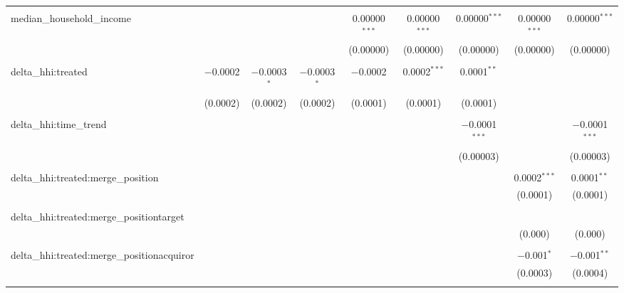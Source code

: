 \begin{table}[H]
{\begin{tabular}{@{\extracolsep{5pt}}lcccccccc}
   & & & & & & & & \\  

  median\_household\_income &  &  &  & 0.00000$^{***}$ & 0.00000$^{***}$ & 0.00000$^{***}$ & 0.00000$^{***}$ & 0.00000$^{***}$ \\  

   &  &  &  & (0.00000) & (0.00000) & (0.00000) & (0.00000) & (0.00000) \\  

   & & & & & & & & \\  

  delta\_hhi:treated & $-$0.0002 & $-$0.0003$^{*}$ & $-$0.0003$^{*}$ & $-$0.0002 & 0.0002$^{***}$ & 0.0001$^{**}$ &  &  \\  

   & (0.0002) & (0.0002) & (0.0002) & (0.0001) & (0.0001) & (0.0001) &  &  \\  

   & & & & & & & & \\  

  delta\_hhi:time\_trend &  &  &  &  &  & $-$0.0001$^{***}$ &  & $-$0.0001$^{***}$ \\  

   &  &  &  &  &  & (0.00003) &  & (0.00003) \\  

   & & & & & & & & \\  

  delta\_hhi:treated:merge\_position &  &  &  &  &  &  & 0.0002$^{***}$ & 0.0001$^{**}$ \\  

   &  &  &  &  &  &  & (0.0001) & (0.0001) \\  

   & & & & & & & & \\  

  delta\_hhi:treated:merge\_positiontarget &  &  &  &  &  &  &  &  \\  

   &  &  &  &  &  &  & (0.000) & (0.000) \\  

   & & & & & & & & \\  

  delta\_hhi:treated:merge\_positionacquiror &  &  &  &  &  &  & $-$0.001$^{*}$ & $-$0.001$^{**}$ \\  

   &  &  &  &  &  &  & (0.0003) & (0.0004) \\  

   & & & & & & & & \\  


\end{tabular}}
\end{table}
